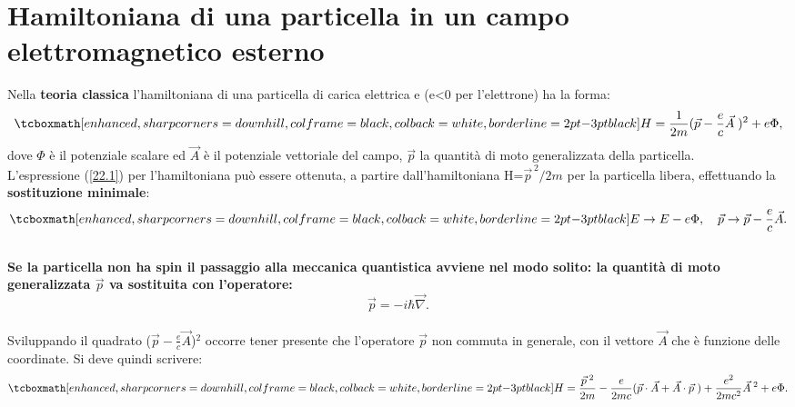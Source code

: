 \chapter[Particella in campo elettromagnetico]{Hamiltoniana di una particella in un campo elettromagnetico esterno}
Nella \textbf{teoria classica} l'hamiltoniana di una particella di carica elettrica e (e<0 per l'elettrone) ha la forma:
	\begin{equation}
		\tcboxmath[enhanced, sharp corners=downhill, colframe=black, colback=white, borderline={2pt}{-3pt}{black}]{
			H=\frac{1}{2m}(\vec{p}-\frac{e}{c}\vec{A}\;)^{2}+e\Phi ,
			}
	\label{22.1}
	\end{equation}
dove $\Phi$ è il potenziale scalare ed $\vec{A}$ è il potenziale vettoriale del campo, $\vec{p}$ la quantità di moto generalizzata della particella. \\

L'espressione (\ref{22.1}) per l'hamiltoniana può essere ottenuta, a partire dall'hamiltoniana H=$\vec{p}^{\,2}/2m$ per la particella libera, effettuando la \textbf{sostituzione minimale}:
	\begin{equation}
		\tcboxmath[enhanced, sharp corners=downhill, colframe=black, colback=white, borderline={2pt}{-3pt}{black}]{
			E\rightarrow E-e\Phi,\quad \vec{p}\rightarrow \vec{p}-\frac{e}{c}\vec{A} .
			}
	\end{equation}\\
	
\textbf{Se la particella non ha spin il passaggio alla meccanica quantistica avviene nel modo solito: la quantità di moto generalizzata $\vec{p}$ va sostituita con l'operatore:}
	\begin{equation}
		\vec{p}=-i\hbar \vec{\nabla} .
	\end{equation}\\

Sviluppando il quadrato ($\vec{p}-\frac{e}{c}\vec{A}$)$^{2}$ occorre tener presente che l'operatore $\vec{p}$ non commuta in generale, con il vettore $\vec{A}$ che è funzione delle coordinate. Si deve quindi scrivere:
	\begin{equation}
		\tcboxmath[enhanced, sharp corners=downhill, colframe=black, colback=white, borderline={2pt}{-3pt}{black}]{
			H= \frac{\vec{p}^{\;2}}{2m}-\frac{e}{2mc}(\vec{p}\cdot\vec{A}+\vec{A}\cdot\vec{p}\;)+\frac{e^{2}}{2mc^{2}}\vec{A}^{\;2}+e\Phi .
			}
	\label{22.4}
	\end{equation}\\
	
